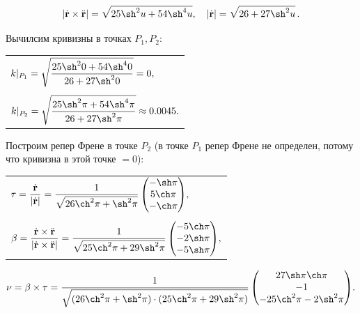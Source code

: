 \documentclass[12pt,a4paper]{article}
\newcommand{\boldVec}[1]{\mathbf #1}
\newcommand{\vectorProduct}[2]{\boldVec #1 \times \boldVec #2}
\begin{document}
    \[
        | \dot{\boldVec r} \times \ddot{\boldVec r} | = \sqrt{25 \sh^2 u + 54 \sh^4 u},\quad  | \dot{\boldVec r} | = \sqrt{26 + 27 \sh^2 u}\, .
    \]

    Вычилсим кривизны в точках $ P_1, P_2 \colon $
    \begin{table}[h!]
        \centering
        \begin{tabular}{l}
            $
                k|_{P_1} = \sqrt{\dfrac{25 \sh^2 0 + 54 \sh^4 0}{26 + 27 \sh^2 0}} = 0,
            $
            \\ \\
            $
                k|_{P_2} = \sqrt{\dfrac{25 \sh^2 \pi + 54 \sh^4 \pi}{26 + 27 \sh^2 \pi}} \approx 0.0045.
            $
        \end{tabular}
    \end{table}


    Построим репер Френе в точке $ P_2 $ (в точке $ P_1$ репер Френе не определен, потому что кривизна в этой точке $ = 0$):
    \begin{table}[h!]
        \centering
        \begin{tabular}{l}
            $
                \boldVec{\tau} = \dfrac{\dot{\boldVec{r}}}{|\dot{\boldVec{r}}|} = \dfrac{1}{\sqrt{26 \ch^2 \pi + \sh^2 \pi}} 
                    \begin{pmatrix}
                        -\sh \pi 
                        \\
                        5 \ch \pi
                        \\
                        -\ch \pi
                    \end{pmatrix}\!,
            $
            \\ \\ 
            $
                \boldVec{\beta} = \dfrac{\dot{\boldVec r} \times \ddot{\boldVec r}}{ | \dot{\boldVec r} \times \ddot{\boldVec r} |} = \dfrac{1}{\sqrt{25\ch^2 \pi + 29\sh^2 \pi}} 
                    \begin{pmatrix}
                        -5\ch \pi 
                        \\
                        -2\sh \pi
                        \\
                        -5\sh \pi 
                    \end{pmatrix}\!,
            $
        \end{tabular}
    \end{table}
    \[
        \boldVec{\nu} = \vectorProduct{\beta}{\tau} = \dfrac{1}{\sqrt{(26 \ch^2 \pi + \sh^2 \pi) \cdot (25\ch^2 \pi + 29\sh^2 \pi)}}
            \begin{pmatrix}
                27 \sh \pi \ch \pi
                \\
                -1
                \\
                -25 \ch^2 \pi - 2\sh^2 \pi
            \end{pmatrix}\!.
    \]
\end{document}
